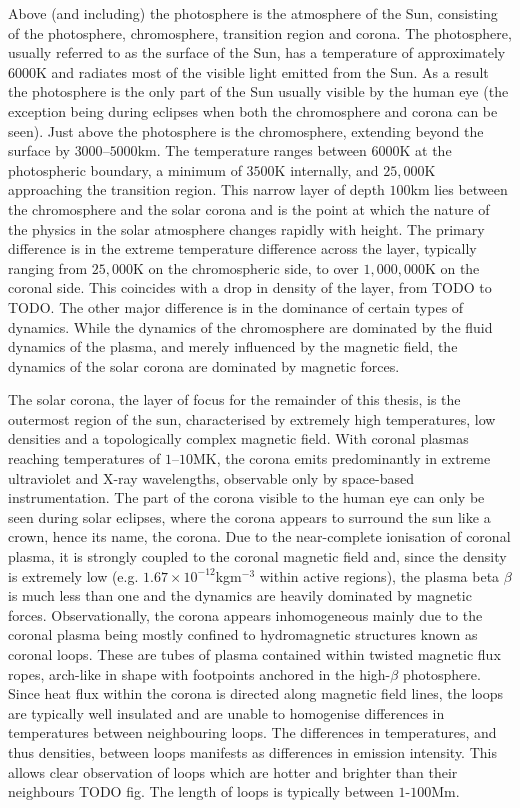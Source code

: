 Above (and including) the photosphere is the atmosphere of the Sun, consisting of the photosphere, chromosphere, transition region and corona. The photosphere, usually referred to as the surface of the Sun, has a temperature of approximately $6000$K and radiates most of the visible light emitted from the Sun. As a result the photosphere is the only part of the Sun usually visible by the human eye (the exception being during eclipses when both the chromosphere and corona can be seen). Just above the photosphere is the chromosphere, extending beyond the surface by $3000$--$5000$km. The temperature ranges between $6000$K at the photospheric boundary, a minimum of $3500$K internally, and $25,000$K approaching the transition region. This narrow layer of depth $100$km lies between the chromosphere and the solar corona and is the point at which the nature of the physics in the solar atmosphere changes rapidly with height. The primary difference is in the extreme temperature difference across the layer, typically ranging from $25,000$K on the chromospheric side, to over $1,000,000$K on the coronal side. This coincides with a drop in density of the layer, from TODO to TODO. The other major difference is in the dominance of certain types of dynamics. While the dynamics of the chromosphere are dominated by the fluid dynamics of the plasma, and merely influenced by the magnetic field, the dynamics of the solar corona are dominated by magnetic forces.

The solar corona, the layer of focus for the remainder of this thesis, is the outermost region of the sun, characterised by extremely high temperatures, low densities and a topologically complex magnetic field. With coronal plasmas reaching temperatures of $1$--$10$MK, the corona emits predominantly in extreme ultraviolet and X-ray wavelengths, observable only by space-based instrumentation. The part of the corona visible to the human eye can only be seen during solar eclipses, where the corona appears to surround the sun like a crown, hence its name, the corona. Due to the near-complete ionisation of coronal plasma, it is strongly coupled to the coronal magnetic field and, since the density is extremely low (e.g. $1.67 \times 10^{-12}$kgm$^{-3}$ within active regions), the plasma beta $\beta$ is much less than one and the dynamics are heavily dominated by magnetic forces. Observationally, the corona appears inhomogeneous mainly due to the coronal plasma being mostly confined to hydromagnetic structures known as coronal loops. These are tubes of plasma contained within twisted magnetic flux ropes, arch-like in shape with footpoints anchored in the high-$\beta$ photosphere. Since heat flux within the corona is directed along magnetic field lines, the loops are typically well insulated and are unable to homogenise differences in temperatures between neighbouring loops. The differences in temperatures, and thus densities, between loops manifests as differences in emission intensity. This allows clear observation of loops which are hotter and brighter than their neighbours TODO fig. The length of loops is typically between $1$-$100$Mm.

